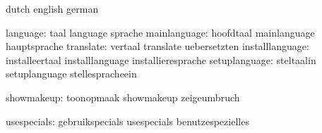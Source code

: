




\startcommands                  dutch                        english
                                german

                     language:  taal                         language
                                sprache
                 mainlanguage:  hoofdtaal                    mainlanguage
                                hauptsprache
                    translate:  vertaal                      translate
                                uebersetzten
              installlanguage:  installeertaal               installlanguage
                                installieresprache
                setuplanguage:  steltaalin                   setuplanguage
                                stellespracheein

                   showmakeup:  toonopmaak                   showmakeup
                                zeigeumbruch

                  usespecials:  gebruikspecials              usespecials
                                benutzespezielles

